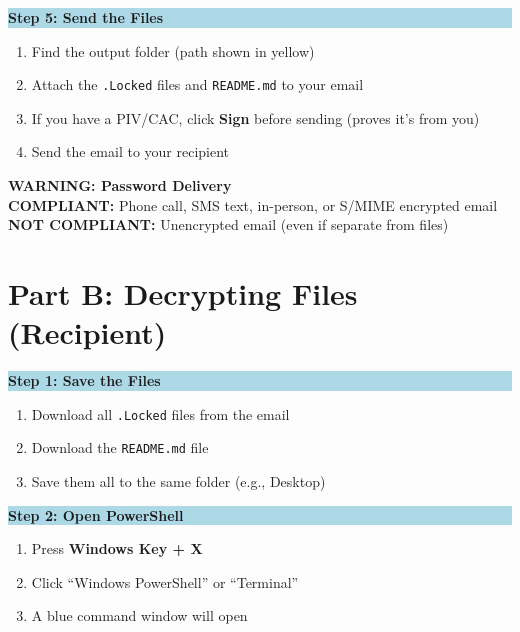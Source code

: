 \documentclass[11pt,letterpaper]{article}
\begin{document}
\colorbox{lightblue}{\parbox{\dimexpr\textwidth-2\fboxsep}{\textbf{Step 5: Send the Files}}}
\begin{enumerate}[leftmargin=0.4in, topsep=2pt]
    \item Find the output folder (path shown in yellow)
    \item Attach the \texttt{.Locked} files and \texttt{README.md} to your email
    \item If you have a PIV/CAC, click \textbf{Sign} before sending (proves it's from you)
    \item Send the email to your recipient
\end{enumerate}

\vspace{6pt}
\colorbox{lightred}{\parbox{\dimexpr\textwidth-2\fboxsep}{
\textbf{WARNING: Password Delivery}\\[3pt]
\textbf{COMPLIANT:} Phone call, SMS text, in-person, or S/MIME encrypted email\\
\textbf{NOT COMPLIANT:} Unencrypted email (even if separate from files)
}}

\newpage

\section*{Part B: Decrypting Files (Recipient)}

\colorbox{lightblue}{\parbox{\dimexpr\textwidth-2\fboxsep}{\textbf{Step 1: Save the Files}}}
\begin{enumerate}[leftmargin=0.4in, topsep=2pt]
    \item Download all \texttt{.Locked} files from the email
    \item Download the \texttt{README.md} file
    \item Save them all to the same folder (e.g., Desktop)
\end{enumerate}

\colorbox{lightblue}{\parbox{\dimexpr\textwidth-2\fboxsep}{\textbf{Step 2: Open PowerShell}}}
\begin{enumerate}[leftmargin=0.4in, topsep=2pt]
    \item Press \textbf{Windows Key + X}
    \item Click ``Windows PowerShell'' or ``Terminal''
    \item A blue command window will open
\end{enumerate}
\end{document}
